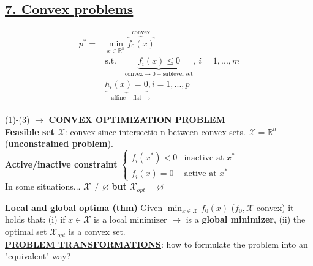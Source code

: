 \documentclass[a4paper]{article}
\begin{document}
\subsection*{\underline{7. Convex problems}}
\vspace{-0.5cm}
\begin{multicols}{2}
    \begin{align}
        p^*=&\min_{x\in\mathbb{R}^n} \overbrace{f_0(x)}^{\text{convex}}\\
         &\text{s.t.} \quad \underbrace{f_i(x)\le0}_{\text{convex}\to 0-\text{sublevel set}}, \  i=1,..., m\\
         &\underbrace{h_i(x)=0}_{\text{affine}\to\ \text{flat}},  i=1,...,p
    \end{align}\\
    (1)-(3) $\to$ \textbf{CONVEX OPTIMIZATION PROBLEM}\\

    \noindent
    \textbf{Feasible set} $\mathcal{X}$: convex since intersectio n between convex sets. $\mathcal{X}=\mathbb{R}^n$ (\textbf{unconstrained problem}).\\
    \textbf{Active/inactive constraint} $\begin{cases}
        f_i(x^*)<0&\text{inactive at $x^*$}\\
        f_i(x)=0&\text{active at $x^*$}    
    \end{cases}$\\
    In some situations...
    $\mathcal{X}\ne\varnothing$ \textbf{but} $\mathcal{X}_{opt}=\varnothing$  
\end{multicols}
\noindent
\textbf{Local and global optima (thm)} Given $\min_{x\in\mathcal{X}}{f_0(x)}$ ($f_0, \mathcal{X}$ convex) it holds that: (i) if $x\in\mathcal{X}$ is a local minimizer $\to$ is a \textbf{global minimizer}, (ii) the optimal set $\mathcal{X}_{opt}$ is a convex set.\\
\textbf{\underline{PROBLEM TRANSFORMATIONS}}: how to formulate the problem into an "equivalent" way?\\
\end{document}
